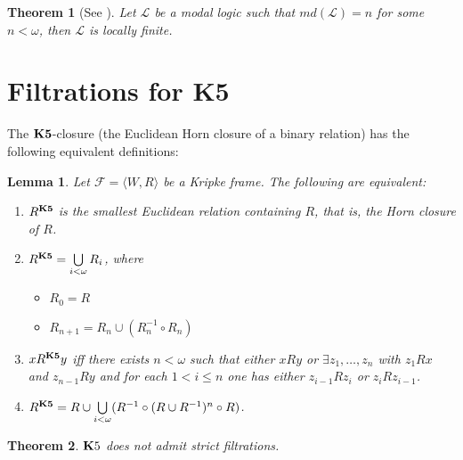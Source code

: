 \documentclass[a4paper]{article}
\theoremstyle{defin}
\theoremstyle{theorem}
\newtheorem{theorem}{Theorem}
\theoremstyle{prop}
\theoremstyle{lemma}
\newtheorem{lemma}{Lemma}
\theoremstyle{fact}
\theoremstyle{exercise}
\theoremstyle{ex}
\theoremstyle{col}
\theoremstyle{claim}
\begin{document}
\begin{theorem} [See \cite{gabbay1998products}]
  Let $\mathcal{L}$ be a modal logic such that $md(\mathcal{L}) = n$ for some $n < \omega$, then $\mathcal{L}$ is locally finite.
\end{theorem}

\section{Filtrations for {\bf K5}}

The ${\bf K5}$-closure (the Euclidean Horn closure of a binary relation) has the following equivalent definitions:
\begin{lemma} \label{equivHorn}
  Let $\mathcal{F} = \langle W, R \rangle$ be a Kripke frame. The following are equivalent:

  \begin{enumerate}
    \item $R^{\bf K5}$ is the smallest Euclidean relation containing $R$, that is, the Horn closure of $R$.
    \item $R^{\bf K5} = \bigcup \limits_{i < \omega} R_i$, where
    \begin{itemize}
      \item $R_0 = R$
      \item $R_{n + 1} = R_n \cup (R^{-1}_n \circ R_n)$
    \end{itemize}
    \item $x R^{\bf K5} y$ iff there exists $n < \omega$ such that
    either $x R y$ or $\exists z_1, \dots, z_n$ with $z_1 R x$ and $z_{n - 1} R y$ and for each $1 < i \leq n$ one has
    either $z_{i - 1} R z_i$ or $z_i R z_{i - 1}$.
    \item $R^{\bf K5} = R \cup \bigcup \limits_{i < \omega} (R^{-1} \circ (R \cup R^{-1})^n \circ R)$.
  \end{enumerate}
\end{lemma}


\begin{theorem}\label{sad}
  ${\bf K}5$ does not admit strict filtrations.
\end{theorem}
\end{document}
